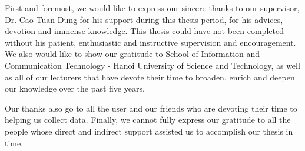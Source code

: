 \begin{acknowledgement}
First and foremost, we would like to express our sincere thanks to our supervisor, Dr. Cao Tuan Dung for his support during this thesis period, for his advices, devotion and immense knowledge. This thesis could have not been completed without his patient, enthusiastic and instructive supervision and encouragement. We also would like to show our gratitude to School of Information and Communication Technology - Hanoi University of Science and Technology, as well as all of our lecturers that have devote their time to broaden, enrich and deepen our knowledge over the past five years. 

Our thanks also go to all the user and our friends who are devoting their time to helping us collect data. Finally, we cannot fully express our gratitude to all the people whose direct and indirect support assisted us to accomplish our thesis in time.

\end{acknowledgement}